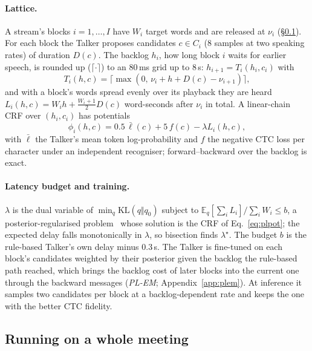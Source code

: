 \paragraph{Lattice.} A stream's blocks $i=1,\dots,I$ have $W_i$ target words and are released at $\nu_i$
(\S\ref{sec:method-online}). For each block the Talker proposes candidates $c\in C_i$ (8 samples at two speaking rates)
of duration $D(c)$. The backlog $h_i$, how long block $i$ waits for earlier speech, is rounded up ($\lceil\cdot\rceil$) to an 80\,ms grid
up to 8\,s:
$h_{i+1}=T_i(h_i,c_i)$ with
\begin{equation}
T_i(h,c)=\big\lceil\max(0,\,\nu_i+h+D(c)-\nu_{i+1})\big\rceil,
\label{eq:backlog}
\end{equation}
and with a block's words spread evenly over its playback they are heard $L_i(h,c)=W_ih+\tfrac{W_i+1}{2}D(c)$
word-seconds after $\nu_i$ in total. A linear-chain CRF over $(h_i,c_i)$ has potentials
\begin{equation}
\phi_i(h,c)=0.5\,\bar{\ell}(c)+5\,f(c)-\lambda L_i(h,c),
\label{eq:plpot}
\end{equation}
with $\bar{\ell}$ the Talker's mean token log-probability and $f$ the negative CTC loss per character under an
independent recogniser; forward--backward over the backlog is exact.

\paragraph{Latency budget and training.} $\lambda$ is the dual variable of $\min_q\mathrm{KL}(q\Vert q_0)$ subject to
$\mathbb{E}_q[\sum_iL_i]/\sum_iW_i\le b$, a posterior-regularised problem~\citep{ganchev2010posterior} whose solution is the
CRF of Eq.~\eqref{eq:plpot}; the expected delay falls monotonically in $\lambda$, so bisection finds $\lambda^\star$. The
budget $b$ is the rule-based Talker's own delay minus 0.3\,s. The Talker is fine-tuned on each block's candidates weighted
by their posterior given the backlog the rule-based path reached, which brings the backlog cost of later blocks into the
current one through the backward messages (\emph{PL-EM}; Appendix~\ref{app:plem}). At inference it samples two
candidates per block at a backlog-dependent rate and keeps the one with the better CTC fidelity.

\subsection{Running on a whole meeting}
\label{sec:method-online}

